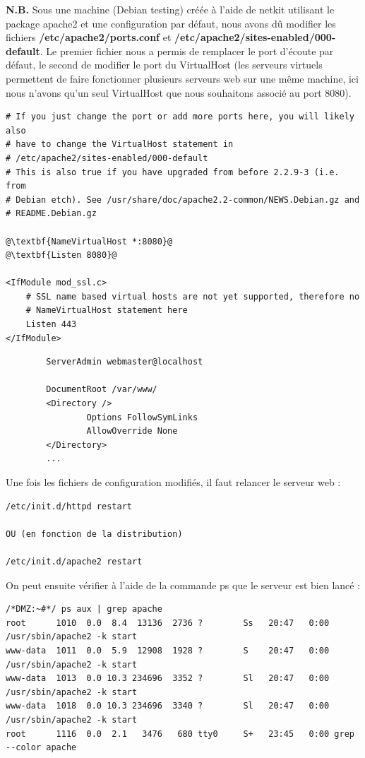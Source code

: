 \documentclass[frenchb, 11pt]{article}
\begin{document}
\noindent \textbf{N.B.} Sous une machine (Debian testing) créée à l'aide de netkit utilisant le package apache2 et une configuration par défaut, nous avons dû modifier les fichiers \textbf{/etc/apache2/ports.conf} et \textbf{/etc/apache2/sites-enabled/000-default}. Le premier fichier nous a permis de remplacer le port d'écoute par défaut, le second de modifier le port du VirtualHost (les serveurs virtuels permettent de faire fonctionner plusieurs serveurs web sur une même machine, ici nous n'avons qu'un seul VirtualHost que nous souhaitons associé au port 8080).

\begin{lstlisting}[caption=/etc/apache2/ports.conf, escapechar=@]
# If you just change the port or add more ports here, you will likely also
# have to change the VirtualHost statement in
# /etc/apache2/sites-enabled/000-default
# This is also true if you have upgraded from before 2.2.9-3 (i.e. from
# Debian etch). See /usr/share/doc/apache2.2-common/NEWS.Debian.gz and
# README.Debian.gz

@\textbf{NameVirtualHost *:8080}@
@\textbf{Listen 8080}@

<IfModule mod_ssl.c>
    # SSL name based virtual hosts are not yet supported, therefore no
    # NameVirtualHost statement here
    Listen 443
</IfModule>
\end{lstlisting}

\begin{lstlisting}[caption=/etc/apache2/sites-enabled/000-default, escapechar=\%]
%\textbf{<VirtualHost *:8080>}%
        ServerAdmin webmaster@localhost

        DocumentRoot /var/www/
        <Directory />
                Options FollowSymLinks
                AllowOverride None
        </Directory>
		...
\end{lstlisting}

\noindent Une fois les fichiers de configuration modifiés, il faut relancer le serveur web :
\begin{lstlisting}
/etc/init.d/httpd restart

OU (en fonction de la distribution)

/etc/init.d/apache2 restart
\end{lstlisting}
\hfill

\noindent On peut ensuite vérifier à l'aide de la commande ps que le serveur est bien lancé :
\begin{lstlisting}
/*DMZ:~#*/ ps aux | grep apache
root      1010  0.0  8.4  13136  2736 ?        Ss   20:47   0:00 /usr/sbin/apache2 -k start
www-data  1011  0.0  5.9  12908  1928 ?        S    20:47   0:00 /usr/sbin/apache2 -k start
www-data  1013  0.0 10.3 234696  3352 ?        Sl   20:47   0:00 /usr/sbin/apache2 -k start
www-data  1018  0.0 10.3 234696  3340 ?        Sl   20:47   0:00 /usr/sbin/apache2 -k start
root      1116  0.0  2.1   3476   680 tty0     S+   23:45   0:00 grep --color apache
\end{lstlisting}
\hfill
\end{document}
